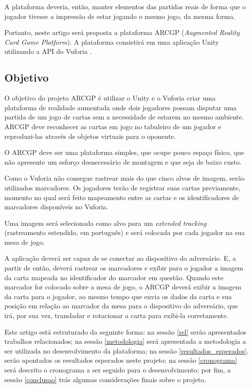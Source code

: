 \documentclass[conference]{IEEEtran}
\begin{document}
A plataforma deveria, então, manter elementos das partidas reais de forma 
que o jogador tivesse a impressão de estar jogando o mesmo jogo, da mesma forma.

Portanto, neste artigo será proposta a plataforma ARCGP (\textit{Augmented 
Reality Card Game Platform}). A plataforma consistirá em uma aplicação 
Unity \cite{unity} utilizando a API do Vuforia \cite{vuforia}. 

\subsection{Objetivo}
\label{objetivo}
O objetivo do projeto ARCGP é utilizar o Unity e o Vuforia criar uma plataforma 
de realidade aumentada onde dois jogadores possam disputar uma partida de um 
jogo de cartas sem a necessidade de estarem no mesmo ambiente. ARCGP deve 
reconhecer as cartas em jogo no tabuleiro de um jogador e reproduzi-las através 
de objetos virtuais para o oponente.

O ARCGP deve ser uma plataforma simples, que ocupe pouco espaço físico, que não 
apresente um esforço desnecessário de montagem e que seja de baixo custo.

Como o Vuforia não consegue rastrear mais do que cinco alvos de imagem, serão 
utilizados marcadores. Os jogadores terão de registrar suas cartas previamente, 
momento no qual será feito mapeamento entre as cartas e os identificadores de 
marcadores disponíveis no Vuforia.

Uma imagem será selecionada como alvo para um \textit{extended tracking} 
(rastreamento estendido, em português) e será colocada por cada jogador na sua 
mesa de jogo.

A aplicação deverá ser capaz de se conectar ao dispositivo do adversário. E, a 
partir de então, deverá rastrear os marcadores e exibir para o jogador a imagem 
da carta mapeada no identificador do marcador em questão. Quando este marcador 
for colocado sobre a mesa de jogo, o ARCGP deverá exibir a imagem da carta para 
o jogador, ao mesmo tempo que envia os dados da carta e sua posição em relação 
ao marcador da mesa para o dispositivo do adversário, que irá, por sua vez, 
transladar e rotacionar a carta para exibi-la corretamente.

Este artigo está estruturado da seguinte forma: na sessão \ref{rel} serão 
apresentados trabalhos relacionados; na sessão \ref{metodologia} será 
apresentada a metodologia a ser utilizada no desenvolvimento da plataforma; na 
sessão \ref{resultados_esperados}, serão apontados os resultados esperados 
neste projeto; na sessão \ref{cronograma} será descrito o cronograma a ser 
seguido para o desenvolvimento; por fim, a sessão \ref{conclusao} trás algumas 
considerações finais sobre o projeto.
\end{document}
